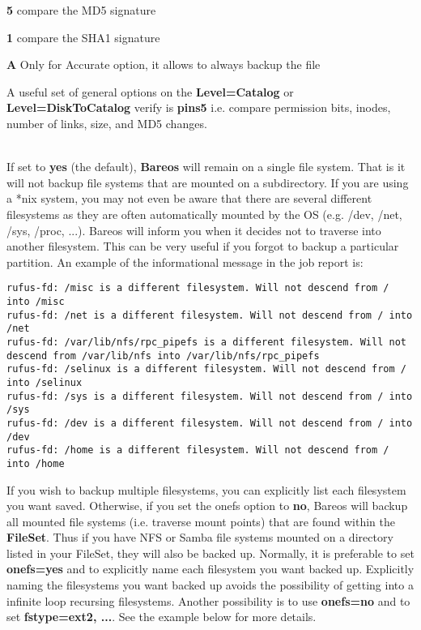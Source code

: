 \begin{description}
\begin{description}
      \item {\bf 5}
      compare the MD5 signature

      \item {\bf 1}
      compare the SHA1 signature

      \item {\bf A}
      Only for Accurate option, it allows to always backup the file

      \end{description}

   A useful set of general options on the {\bf Level=Catalog}  or {\bf
   Level=DiskToCatalog}  verify is {\bf pins5} i.e. compare permission bits,
   inodes, number  of links, size, and MD5 changes.

\item [onefs=yes{\textbar}no] \hfill \\
   If set to {\bf yes} (the default), {\bf Bareos} will remain on a single
   file system.  That is it will not backup file systems that are mounted
   on a subdirectory.  If you are using a *nix system, you may not even be
   aware that there are several different filesystems as they are often
   automatically mounted by the OS (e.g.  /dev, /net, /sys, /proc, ...).
   Bareos will inform you when it decides not to
   traverse into another filesystem.  This can be very useful if you forgot
   to backup a particular partition.  An example of the informational
   message in the job report is:

\footnotesize
\begin{verbatim}
rufus-fd: /misc is a different filesystem. Will not descend from / into /misc
rufus-fd: /net is a different filesystem. Will not descend from / into /net
rufus-fd: /var/lib/nfs/rpc_pipefs is a different filesystem. Will not descend from /var/lib/nfs into /var/lib/nfs/rpc_pipefs
rufus-fd: /selinux is a different filesystem. Will not descend from / into /selinux
rufus-fd: /sys is a different filesystem. Will not descend from / into /sys
rufus-fd: /dev is a different filesystem. Will not descend from / into /dev
rufus-fd: /home is a different filesystem. Will not descend from / into /home
\end{verbatim}
\normalsize

   If you wish to backup multiple filesystems, you can  explicitly
   list each filesystem you want saved.  Otherwise, if you set the onefs option
   to {\bf no}, Bareos will backup  all mounted file systems (i.e. traverse mount
   points) that  are found within the {\bf FileSet}. Thus if  you have NFS or
   Samba file systems mounted on a directory listed  in your FileSet, they will
   also be backed up. Normally, it is  preferable to set {\bf onefs=yes} and to
   explicitly name  each filesystem you want backed up. Explicitly naming  the
   filesystems you want backed up avoids the possibility  of getting into a
   infinite loop recursing filesystems.  Another possibility is to
   use {\bf onefs=no} and to set {\bf fstype=ext2, ...}.
   See the example below for more details.


\end{description}
